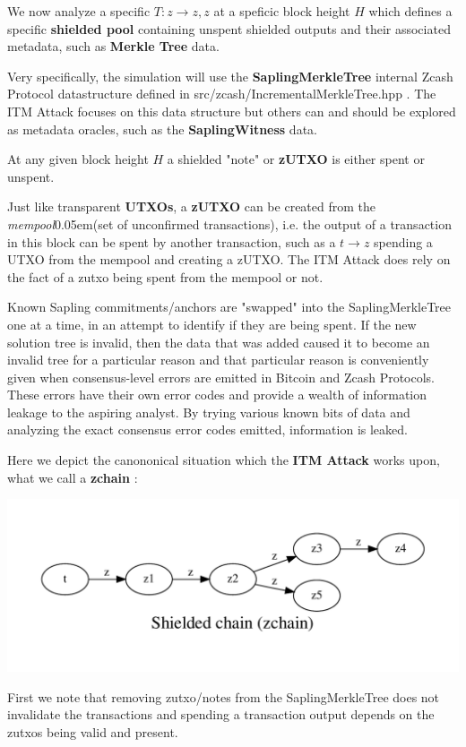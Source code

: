 \documentclass{article}
\newcommand{\term}[1]{\textsl{#1}\kern 0.05em\xspace}
\newcommand{\mempool}{\term{mempool}}
\newcommand{\zchain}{\textbf{zchain} }
\newcommand{\ITM}{\textbf{ITM Attack} }
\begin{document}
We now analyze a specific $T: z \rightarrow z,z$ at a speficic block height $H$ which
defines a specific \textbf{shielded pool} containing unspent shielded outputs and their
associated metadata, such as \textbf{Merkle Tree} data.

Very specifically, the simulation will use the \textbf{SaplingMerkleTree} internal Zcash Protocol datastructure defined in src/zcash/IncrementalMerkleTree.hpp . The ITM Attack focuses on this data structure but others can and should be explored as metadata oracles, such as the \textbf{SaplingWitness} data.

At any given block height $H$ a shielded "note" or \textbf{zUTXO} is either spent or unspent.

Just like transparent \textbf{UTXOs}, a \textbf{zUTXO} can be created from the \mempool (set of unconfirmed transactions), i.e. the output of a transaction in this block can be spent by another transaction, such as a $ t \rightarrow z $ spending a UTXO from the mempool and creating a zUTXO. The ITM Attack does rely on the fact of a zutxo being spent from the mempool or not.

Known Sapling commitments/anchors are "swapped" into the SaplingMerkleTree one at a time,
in an attempt to identify if they are being spent. If the new solution tree is invalid, then the data that was added caused it to become an invalid tree for a particular reason and
that particular reason is conveniently given when consensus-level errors are emitted in Bitcoin and Zcash Protocols. These errors have their own error codes and provide a wealth of information leakage to the aspiring analyst. By trying various known bits of data and analyzing the exact consensus error codes emitted, information is leaked.

Here we depict the canononical situation which the \ITM works upon, what we call a \zchain :

\includegraphics[scale=0.9]{itm-zchain.pdf}

First we note that removing zutxo/notes from the SaplingMerkleTree does not invalidate the transactions and 
spending a transaction output depends on the zutxos being valid and present.
\end{document}
